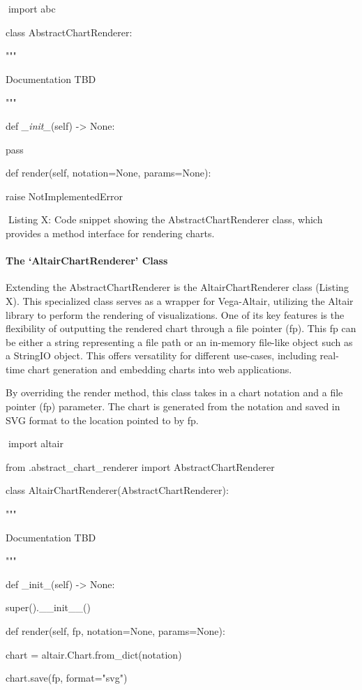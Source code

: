 \documentclass[
]{article}
\begin{document}
import abc

class AbstractChartRenderer:

"""

Documentation TBD

"""

def \emph{\_init\_}(self) -\textgreater{} None:

pass

def render(self, notation=None, params=None):

raise NotImplementedError

Listing X: Code snippet showing the AbstractChartRenderer class, which
provides a method interface for rendering charts.

\paragraph{The `AltairChartRenderer'
Class}\label{the-altairchartrenderer-class}

Extending the AbstractChartRenderer is the AltairChartRenderer class
(Listing X). This specialized class serves as a wrapper for Vega-Altair,
utilizing the Altair library to perform the rendering of visualizations.
One of its key features is the flexibility of outputting the rendered
chart through a file pointer (fp). This fp can be either a string
representing a file path or an in-memory file-like object such as a
StringIO object. This offers versatility for different use-cases,
including real-time chart generation and embedding charts into web
applications.

By overriding the render method, this class takes in a chart notation
and a file pointer (fp) parameter. The chart is generated from the
notation and saved in SVG format to the location pointed to by fp.

import altair

from .abstract\_chart\_renderer import AbstractChartRenderer

class AltairChartRenderer(AbstractChartRenderer):

"""

Documentation TBD

"""

def \_init\_(self) -\textgreater{} None:

super().\_\_init\_\_()

def render(self, fp, notation=None, params=None):

chart = altair.Chart.from\_dict(notation)

chart.save(fp, format="svg")
\end{document}
